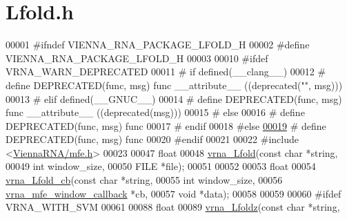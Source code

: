 \hypertarget{_lfold_8h_source}{}\section{Lfold.\+h}
\label{_lfold_8h_source}

\begin{DoxyCode}
00001 \textcolor{preprocessor}{#ifndef VIENNA\_RNA\_PACKAGE\_LFOLD\_H}
00002 \textcolor{preprocessor}{#define VIENNA\_RNA\_PACKAGE\_LFOLD\_H}
00003 
00010 \textcolor{preprocessor}{#ifdef VRNA\_WARN\_DEPRECATED}
00011 \textcolor{preprocessor}{# if defined(\_\_clang\_\_)}
00012 \textcolor{preprocessor}{#  define DEPRECATED(func, msg) func \_\_attribute\_\_ ((deprecated("", msg)))}
00013 \textcolor{preprocessor}{# elif defined(\_\_GNUC\_\_)}
00014 \textcolor{preprocessor}{#  define DEPRECATED(func, msg) func \_\_attribute\_\_ ((deprecated(msg)))}
00015 \textcolor{preprocessor}{# else}
00016 \textcolor{preprocessor}{#  define DEPRECATED(func, msg) func}
00017 \textcolor{preprocessor}{# endif}
00018 \textcolor{preprocessor}{#else}
\mbox{\hyperlink{_lfold_8h_aab347a3c03fbe8e7319551b9fa0cce4a}{00019}} \textcolor{preprocessor}{# define DEPRECATED(func, msg) func}
00020 \textcolor{preprocessor}{#endif}
00021 
00022 \textcolor{preprocessor}{#include <\mbox{\hyperlink{mfe_8h}{ViennaRNA/mfe.h}}>}
00023 
00047 \textcolor{keywordtype}{float}
00048 \mbox{\hyperlink{group__local__mfe__fold_ga4918cce52bf69c1913cda503b2ac75d8}{vrna\_Lfold}}(\textcolor{keyword}{const} \textcolor{keywordtype}{char} *\textcolor{keywordtype}{string},
00049            \textcolor{keywordtype}{int}        window\_size,
00050            FILE       *file);
00051 
00052 
00053 \textcolor{keywordtype}{float}
00054 \mbox{\hyperlink{_lfold_8h_a8b70293ad3c9dd3dc384d06290bf8069}{vrna\_Lfold\_cb}}(\textcolor{keyword}{const} \textcolor{keywordtype}{char}                *\textcolor{keywordtype}{string},
00055               \textcolor{keywordtype}{int}                       window\_size,
00056               \mbox{\hyperlink{group__mfe__fold_ga4f3e5bc214ef803074ace313cb9571b4}{vrna\_mfe\_window\_callback}}  *cb,
00057               \textcolor{keywordtype}{void}                      *data);
00058 
00059 
00060 \textcolor{preprocessor}{#ifdef VRNA\_WITH\_SVM}
00061 
00088 \textcolor{keywordtype}{float}
00089 \mbox{\hyperlink{group__local__mfe__fold_ga27fddda5fc63eb49c861e38845fc34b4}{vrna\_Lfoldz}}(\textcolor{keyword}{const} \textcolor{keywordtype}{char}  *\textcolor{keywordtype}{string},

\end{DoxyCode}
